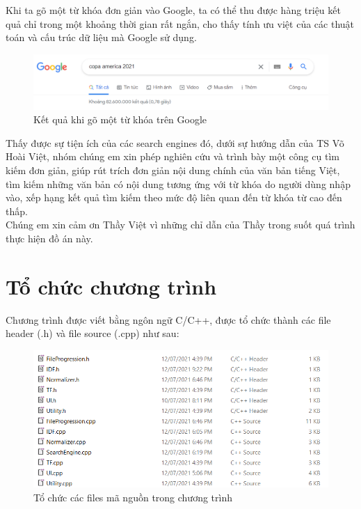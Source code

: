 \documentclass[12pt,a4paper]{article}
\begin{document}
Khi ta gõ một từ khóa đơn giản vào Google, ta có thể thu được hàng triệu kết quả chỉ trong một khoảng thời gian rất ngắn, cho thấy tính ưu việt của các thuật toán và cấu trúc dữ liệu mà Google sử dụng.
\begin{figure}[H]
\begin{center}
\includegraphics[scale=0.5]{Fig3}
\end{center}
\caption{Kết quả khi gõ một từ khóa trên Google}
\label{fig3}
\end{figure}
Thấy được sự tiện ích của các search engines đó, dưới sự hướng dẫn của TS Võ Hoài Việt, nhóm chúng em xin phép nghiên cứu và trình bày một công cụ tìm kiếm đơn giản, giúp rút trích đơn giản nội dung chính của văn bản tiếng Việt, tìm kiếm những văn bản có nội dung
tương ứng với từ khóa do người dùng nhập vào, xếp hạng kết quả tìm kiếm theo mức độ liên quan đến từ khóa từ cao đến thấp.\\
Chúng em xin cảm ơn Thầy Việt vì những chỉ dẫn của Thầy trong suốt quá trình thực hiện đồ án này.
\newpage
\section{Tổ chức chương trình}
Chương trình được viết bằng ngôn ngữ C/C++, được tổ chức thành các file header (.h) và file source (.cpp) như sau:
\begin{figure}[H]
\begin{center}
\includegraphics[scale=1]{Fig4}
\end{center}
\caption{Tổ chức các files mã nguồn trong chương trình}
\label{codefile}
\end{figure}
\end{document}
